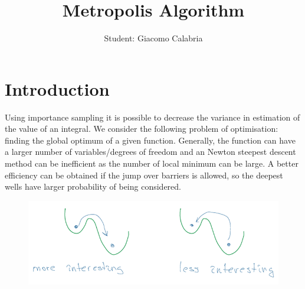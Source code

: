 \documentclass{article}
\title{\textbf{Metropolis Algorithm}}
\author{Student: Giacomo Calabria}
\date{}
\begin{document}
\maketitle

\section*{Introduction}
Using importance sampling it is possible to decrease the variance in estimation of the value of an integral. We consider the following problem of optimisation: finding the global optimum of a given function. Generally, the function can have a larger number of variables/degrees of freedom and an Newton steepest descent method can be inefficient as the number of local minimum can be large. A better efficiency can be obtained if the jump over barriers is allowed, so the deepest wells have larger probability of being considered.
\begin{figure}[H]
    \centering
    \includegraphics[width=0.5\linewidth]{image.png}
    \label{fig:enter-label}
\end{figure}
\end{document}
